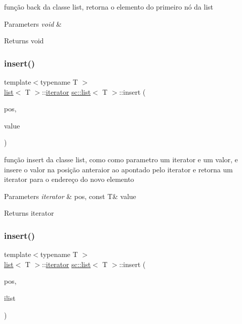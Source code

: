 função back da classe list, retorna o elemento do primeiro nó da list 
\begin{DoxyParams}{Parameters}
{\em void} & \\
\hline
\end{DoxyParams}
\begin{DoxyReturn}{Returns}
void 
\end{DoxyReturn}
\mbox{\label{classsc_1_1list_a633565e547a05308a6f527a0aac716f8}} 
\subsubsection{\texorpdfstring{insert()}{insert()}\hspace{0.1cm}{\footnotesize\ttfamily [1/7]}}
{\footnotesize\ttfamily template$<$typename T $>$ \\
\mbox{\hyperlink{classsc_1_1list}{list}}$<$ T $>$\+::\mbox{\hyperlink{classsc_1_1list_1_1iterator}{iterator}} \mbox{\hyperlink{classsc_1_1list}{sc\+::list}}$<$ T $>$\+::insert (\begin{DoxyParamCaption}\item[{\mbox{\hyperlink{classsc_1_1list_1_1iterator}{iterator}}}]{pos,  }\item[{const T \&}]{value }\end{DoxyParamCaption})}

função insert da classe list, como como parametro um iterator e um valor, e insere o valor na posição anteraior ao apontado pelo iterator e retorna um iterator para o endereço do novo elemento 
\begin{DoxyParams}{Parameters}
{\em iterator} & pos, const T\& value \\
\hline
\end{DoxyParams}
\begin{DoxyReturn}{Returns}
iterator 
\end{DoxyReturn}
\mbox{\label{classsc_1_1list_a80098f156b61ebe5555a2d7762507817}} 
\subsubsection{\texorpdfstring{insert()}{insert()}\hspace{0.1cm}{\footnotesize\ttfamily [2/7]}}
{\footnotesize\ttfamily template$<$typename T $>$ \\
\mbox{\hyperlink{classsc_1_1list}{list}}$<$ T $>$\+::\mbox{\hyperlink{classsc_1_1list_1_1iterator}{iterator}} \mbox{\hyperlink{classsc_1_1list}{sc\+::list}}$<$ T $>$\+::insert (\begin{DoxyParamCaption}\item[{\mbox{\hyperlink{classsc_1_1list_1_1iterator}{iterator}}}]{pos,  }\item[{std\+::initializer\+\_\+list$<$ T $>$}]{ilist }\end{DoxyParamCaption})}

